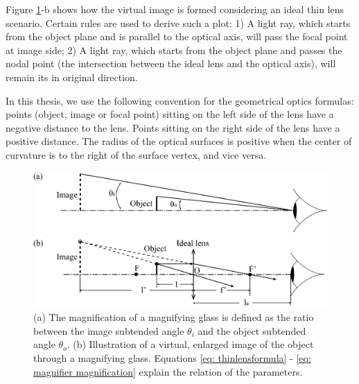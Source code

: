 Figure \ref{fig: geo_formulae}-b shows how the virtual image is formed considering an ideal thin lens scenario. Certain rules are used to derive such a plot:
1) A light ray, which starts from the object plane and is parallel to the optical axis, will pass the focal point at image side;
2) A light ray, which starts from the object plane and passes the nodal point (the intersection between the ideal lens and the optical axis), will remain its in original direction.

In this thesis, we use the following convention for the geometrical optics formulas: points (object, image or focal point) sitting on the left side of the lens have a negative distance to the lens. Points sitting on the right side of the lens have a positive distance. The radius of the optical surfaces is positive when the center of curvature is to the right of the surface vertex, and vice versa. 

\begin{figure}
    \centering
    \includegraphics[scale=0.58]{chapter-1/figures/geo_magnifier_v2.png}
    \caption{(a) The magnification of a magnifying glass is defined as the ratio between the image subtended angle $\theta_{i}$ and  the object subtended angle $\theta_{o}$.  
    (b) Illustration of a virtual, enlarged image of the object through a magnifying glass. Equations \ref{eq: thinlensformula} - \ref{eq: magnifier magnification} explain the relation of the parameters.}
    \label{fig: geo_formulae}
\end{figure} 

